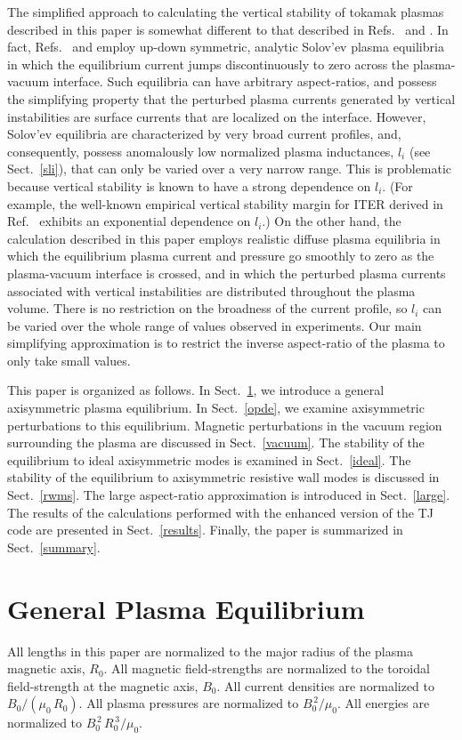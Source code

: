 \documentclass[12pt,prb,aps]{revtex4-1}
\begin{document}
The simplified approach to calculating the vertical stability of tokamak plasmas described in this paper is somewhat different to that described in Refs.~ and .
In fact, Refs.~ and  employ  up-down symmetric, analytic Solov'ev plasma equilibria in which the equilibrium  current jumps discontinuously to zero across the
plasma-vacuum interface. Such equilibria can have arbitrary aspect-ratios, and possess the simplifying property that the perturbed plasma currents generated by vertical instabilities are surface currents that
are localized on the interface. However, Solov'ev equilibria are characterized by very broad current profiles, and,  consequently, possess anomalously low normalized plasma inductances, $l_i$ (see Sect.~\ref{sli}), that can only be varied over a very narrow range. This is problematic because vertical stability is known to
have a strong dependence on $l_i$. (For example, the well-known empirical vertical stability margin for ITER derived in Ref.~ exhibits an
exponential dependence on $l_i$.)
On the other hand, the calculation described in this  paper employs realistic diffuse plasma equilibria in which the equilibrium plasma current  and pressure go smoothly to zero as the plasma-vacuum interface is crossed,
and in which the perturbed plasma currents associated with vertical instabilities are distributed throughout the plasma volume. There is no
restriction on the broadness of the current profile, so $l_i$ can be varied over the whole range of values observed in experiments. 
Our main simplifying approximation is to
restrict the inverse aspect-ratio  of the plasma to only take small values. 

This paper is organized as follows. In Sect.~\ref{geq}, we introduce a general axisymmetric plasma equilibrium. 
In Sect.~\ref{opde}, we examine axisymmetric perturbations to this equilibrium. Magnetic perturbations in the vacuum region
surrounding the plasma are discussed in Sect.~\ref{vacuum}. The stability of the equilibrium to ideal axisymmetric modes is
examined in Sect.~\ref{ideal}. The stability of the equilibrium to axisymmetric resistive wall modes is discussed in Sect.~\ref{rwms}. 
The large aspect-ratio approximation is introduced in Sect.~\ref{large}. The results of the calculations performed with the enhanced version of
the TJ code are presented in Sect.~\ref{results}. Finally, the paper is summarized in Sect.~\ref{summary}. 

\section{General Plasma Equilibrium}\label{geq}
All lengths  in this paper  are normalized to  the major radius of the plasma magnetic axis, $R_0$. All magnetic field-strengths
are normalized to the  toroidal field-strength at the magnetic axis, $B_0$. All current densities are normalized to $B_0/(\mu_0\,R_0)$. 
 All plasma pressures are normalized to $B_0^{\,2}/\mu_0$. All energies are normalized to $B_0^{\,2}\,R_0^{\,3}/\mu_0$. 
\end{document}
